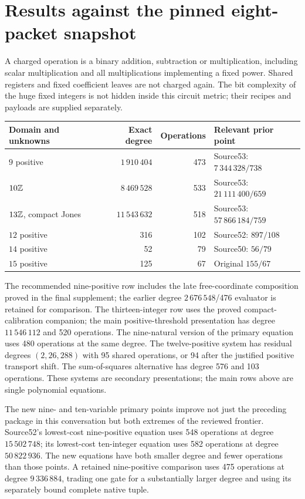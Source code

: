\section{Results against the pinned eight-packet snapshot}
A charged operation is a binary addition, subtraction or multiplication,
including scalar multiplication and all multiplications implementing a fixed
power. Shared registers and fixed coefficient leaves are not charged again.
The bit complexity of the huge fixed integers is not hidden inside this
circuit metric; their recipes and payloads are supplied separately.

\begin{center}\small
\begin{tabular}{@{}lrrl@{}}
\toprule
Domain and unknowns & Exact degree & Operations & Relevant prior point\\
\midrule
$9$ positive & $1\,910\,404$ & 473 & Source53: $7\,344\,328/738$\\
$10\mathbb Z$ & $8\,469\,528$ & 533 & Source53: $21\,111\,400/659$\\
$13\mathbb Z$, compact Jones & $11\,543\,632$ & 518 & Source53: $57\,866\,184/759$\\
$12$ positive & 316 & 102 & Source52: $897/108$\\
$14$ positive & 52 & 79 & Source50: $56/79$\\
$15$ positive & 125 & 67 & Original $155/67$\\
\bottomrule
\end{tabular}
\end{center}
The recommended nine-positive row includes the late free-coordinate
composition proved in the final supplement; the earlier degree
$2\,676\,548$/476 evaluator is retained for comparison.
The thirteen-integer row uses the proved compact-calibration companion;
the main positive-threshold presentation has degree $11\,546\,112$ and
520 operations. The nine-natural version of the primary equation uses
480 operations at the same degree. The twelve-positive system has residual degrees
$(2,26,288)$ with 95 shared operations, or 94 after the justified positive
transport shift. The sum-of-squares alternative has degree 576 and 103
operations. These systems are secondary presentations; the main rows above
are single polynomial equations.

The new nine- and ten-variable primary points improve not just the preceding
package in this conversation but both extremes of the reviewed frontier.
Source52's lowest-cost nine-positive equation uses 548 operations at degree
$15\,502\,748$; its lowest-cost ten-integer equation uses 582 operations at
degree $50\,822\,936$. The new equations have both smaller degree and fewer
operations than those points. A retained nine-positive comparison uses 475
operations at degree $9\,336\,884$, trading one gate for a substantially
larger degree and using its separately bound complete native tuple.

